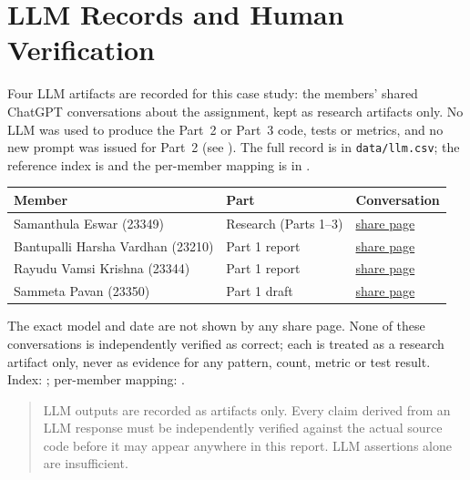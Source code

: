 \documentclass[11pt,a4paper]{article}
\begin{document}
\section{LLM Records and Human Verification}
Four LLM artifacts are recorded for this case study: the members' shared ChatGPT
conversations about the assignment, kept as research artifacts only. No LLM was
used to produce the Part~2 or Part~3 code, tests or metrics, and no new prompt was
issued for Part~2 (see ). The full record is
in \texttt{data/llm.csv}; the reference index is
 and the per-member mapping is in
.

\begin{center}
\small
\begin{tabular}{@{}p{} p{} p{}@{}}
\toprule
Member & Part & Conversation \\
\midrule
Samanthula Eswar (23349) & Research (Parts 1--3) & \href{https://chatgpt.com/share/6aca22a9-2844-83ec-8126-e6f81ef8e85e}{share page} \\
Bantupalli Harsha Vardhan (23210) & Part 1 report & \href{https://chatgpt.com/share/6acf4ad3-5900-83ee-bd23-a3440efaf33a}{share page} \\
Rayudu Vamsi Krishna (23344) & Part 1 report & \href{https://chatgpt.com/share/6acf4a3b-0d60-83ee-af0e-eb5a739699e1?ogimg=plain}{share page} \\
Sammeta Pavan (23350) & Part 1 draft & \href{https://chatgpt.com/share/6acf5448-c740-83e8-b064-e5604a16fb75?ogimg=plain}{share page} \\
\bottomrule
\end{tabular}
\end{center}

The exact model and date are not shown by any share page. None of these
conversations is independently verified as correct; each is treated as a research
artifact only, never as evidence for any pattern, count, metric or test result.
Index: ; per-member mapping:
.

\begin{quote}
LLM outputs are recorded as artifacts only. Every claim derived from an LLM
response must be independently verified against the actual source code before
it may appear anywhere in this report. LLM assertions alone are insufficient.
\end{quote}
\end{document}
